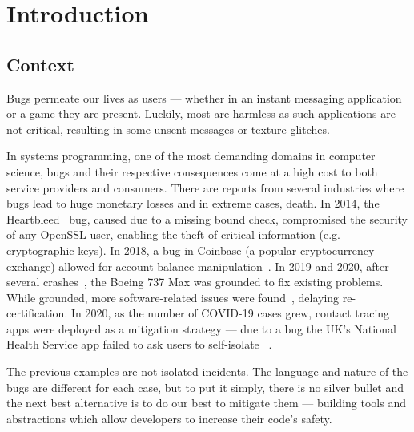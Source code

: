 
\chapter{Introduction}\label{cha:introduction}

\section{Context}\label{sec:context}


Bugs permeate our lives as users --- whether in an instant messaging application or a game they are present.
Luckily, most are harmless as such applications are not critical,
resulting in some unsent messages or texture glitches.

In systems programming, one of the most demanding domains in computer science,
bugs and their respective consequences come at a high cost to both service providers and consumers.
There are reports from several industries where bugs lead to huge monetary losses and in extreme cases, death.
In 2014, the Heartbleed~\autocite{Heartbleed} bug, caused due to a missing bound check,
compromised the security of any OpenSSL user, enabling the theft of critical information (e.g. cryptographic keys).
In 2018, a bug in Coinbase (a popular cryptocurrency exchange)
allowed for account balance manipulation~\autocite{Vicompany2018}.
In 2019 and 2020, after several crashes~\autocite{Campbell2019},
the Boeing 737 Max was grounded to fix existing problems.
While grounded, more software-related issues were found~\autocite{Okane2019,Okane2020}, delaying re-certification.
In 2020, as the number of COVID-19 cases grew,
contact tracing apps were deployed as a mitigation strategy ---
due to a bug the UK's National Health Service app failed to ask users to self-isolate ~\autocite{Mageit2020}.

The previous examples are not isolated incidents.
The language and nature of the bugs are different for each case, but to put it simply,
there is no silver bullet and the next best alternative is to do our best to mitigate them ---
building tools and abstractions which allow developers to increase their code's safety.

